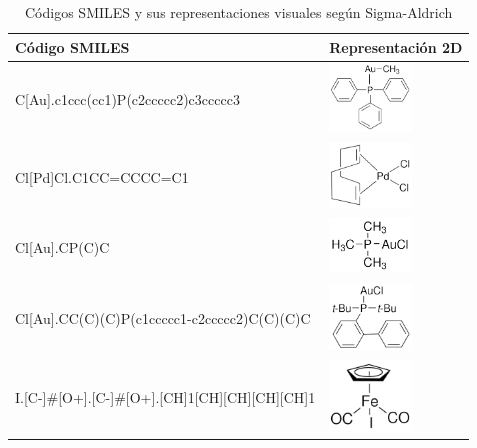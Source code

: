 \begin{table}[h!]
\small
\centering
    \begin{tabular}{m{7cm}>{\centering\arraybackslash}m{4cm}}
        \hline
        \textbf{Código SMILES} & \textbf{Representación 2D} \\
        \hline
        C[Au].c1ccc(cc1)P(c2ccccc2)c3ccccc3 & \includegraphics[width=2.2cm]{imagenes/sigmaAldrich/Methyl(triphenylphosphine)gold(I)} \\ [0.8cm]
        \hline
        Cl[Pd]Cl.C1CC=CCCC=C1 & \includegraphics[width=2.2cm]{imagenes/sigmaAldrich/Dichloro(1,5-cyclooctadiene)palladium(II).png} \\ 
        \hline
        Cl[Au].CP(C)C & \includegraphics[width=2.2cm]{imagenes/sigmaAldrich/Chloro(trimethylphosphine)gold(I).png} \\ [0.8cm]
        \hline
         Cl[Au].CC(C)(C)P(c1ccccc1-c2ccccc2)C(C)(C)C & \includegraphics[width=2.2cm]{imagenes/sigmaAldrich/Chloro[(1,1-biphenyl-2-yl)di-tert-butylphosphine]gold(I).png} \\
        \hline
        [Fe]I.[C-]\#[O+].[C-]\#[O+].[CH]1[CH][CH][CH][CH]1 & \includegraphics[width=2.2cm]{imagenes/sigmaAldrich/Dicarbonylcyclopentadienyliodoiron(II).png} \\
        \hline
        \end{tabular}
    \caption{Códigos SMILES y sus representaciones visuales según Sigma-Aldrich}
    \label{tabla:tabla_peq_intro_sigmaAldrich}
\end{table}

